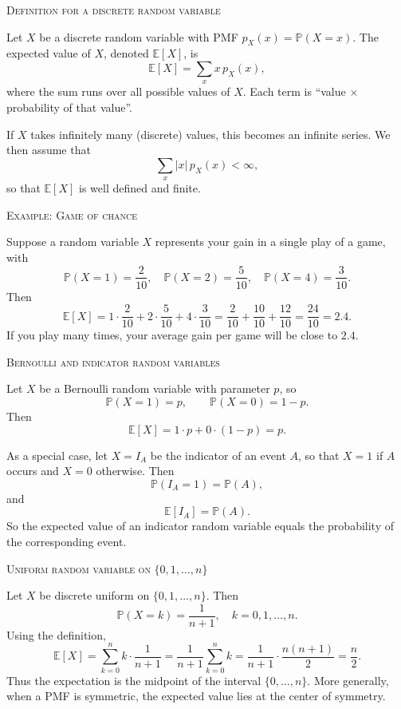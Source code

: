 \bigskip\textsc{Definition for a discrete random variable}

Let \(X\) be a discrete random variable with PMF \(p_X(x) = \mathbb{P}(X = x)\).  
The expected value of \(X\), denoted \(\mathbb{E}[X]\), is
\[
\mathbb{E}[X] = \sum_{x} x \, p_X(x),
\]
where the sum runs over all possible values of \(X\).  
Each term is “value \(\times\) probability of that value”.

If \(X\) takes infinitely many (discrete) values, this becomes an infinite series.  
We then assume that
\[
\sum_{x} |x| \, p_X(x) < \infty,
\]
so that \(\mathbb{E}[X]\) is well defined and finite.

\bigskip\textsc{Example: Game of chance}

Suppose a random variable \(X\) represents your gain in a single play of a game, with
\[
\mathbb{P}(X = 1) = \frac{2}{10}, \quad
\mathbb{P}(X = 2) = \frac{5}{10}, \quad
\mathbb{P}(X = 4) = \frac{3}{10}.
\]
Then
\[
\mathbb{E}[X] = 1 \cdot \frac{2}{10}
             + 2 \cdot \frac{5}{10}
             + 4 \cdot \frac{3}{10}
           = \frac{2}{10} + \frac{10}{10} + \frac{12}{10}
           = \frac{24}{10}
           = 2.4.
\]
If you play many times, your average gain per game will be close to \(2.4\).

\bigskip\textsc{Bernoulli and indicator random variables}

Let \(X\) be a Bernoulli random variable with parameter \(p\), so
\[
\mathbb{P}(X = 1) = p, \qquad \mathbb{P}(X = 0) = 1 - p.
\]
Then
\[
\mathbb{E}[X] = 1 \cdot p + 0 \cdot (1-p) = p.
\]

As a special case, let \(X = I_A\) be the indicator of an event \(A\), so that \(X = 1\) if \(A\) occurs and \(X = 0\) otherwise.  
Then
\[
\mathbb{P}(I_A = 1) = \mathbb{P}(A),
\]
and
\[
\mathbb{E}[I_A] = \mathbb{P}(A).
\]
So the expected value of an indicator random variable equals the probability of the corresponding event.

\bigskip\textsc{Uniform random variable on \(\{0,1,\dots,n\}\)}

Let \(X\) be discrete uniform on \(\{0,1,\dots,n\}\).  
Then
\[
\mathbb{P}(X = k) = \frac{1}{n+1}, \quad k = 0,1,\dots,n.
\]
Using the definition,
\[
\mathbb{E}[X] = \sum_{k=0}^{n} k \cdot \frac{1}{n+1}
              = \frac{1}{n+1} \sum_{k=0}^{n} k
              = \frac{1}{n+1} \cdot \frac{n(n+1)}{2}
              = \frac{n}{2}.
\]
Thus the expectation is the midpoint of the interval \(\{0,\dots,n\}\).  
More generally, when a PMF is symmetric, the expected value lies at the center of symmetry.

